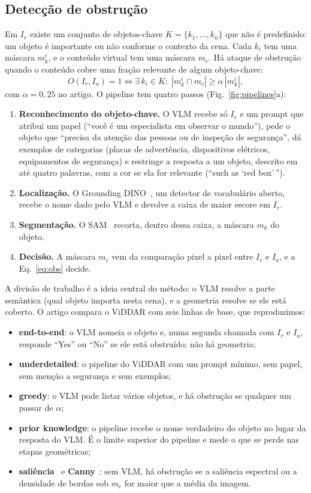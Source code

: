 \documentclass[conference]{IEEEtran}
\newcommand{\Ir}{I_r}
\newcommand{\Ia}{I_a}
\begin{document}
\subsection{Detecção de obstrução}
\label{sec:viddar-obs}
Em $\Ir$ existe um conjunto de objetos-chave $K=\{k_1,\dots,k_n\}$ que não é predefinido: um objeto é
importante ou não conforme o contexto da cena. Cada $k_i$ tem uma máscara $m_k^i$, e o conteúdo virtual
tem uma máscara $m_c$. Há ataque de obstrução quando o conteúdo cobre uma fração relevante de algum
objeto-chave:
\begin{equation}
O(\Ir,\Ia)=1 \iff \exists\, k_i \in K:\; |m_k^i \cap m_c| \geq \alpha\,|m_k^i|,
\label{eq:obs}
\end{equation}
com $\alpha=0{,}25$ no artigo. O pipeline tem quatro passos (Fig.~\ref{fig:pipelines}a):
\begin{enumerate}
\item \textbf{Reconhecimento do objeto-chave.} O VLM recebe só $\Ir$ e um prompt que atribui um papel
  (``você é um especialista em observar o mundo''), pede o objeto que ``precisa da atenção das pessoas ou
  de inspeção de segurança'', dá exemplos de categorias (placas de advertência, dispositivos elétricos,
  equipamentos de segurança) e restringe a resposta a um objeto, descrito em até quatro palavras, com a
  cor se ela for relevante (``such as `red box'\,'').
\item \textbf{Localização.} O Grounding DINO~\cite{groundingdino}, um detector de vocabulário aberto,
  recebe o nome dado pelo VLM e devolve a caixa de maior escore em $\Ir$.
\item \textbf{Segmentação.} O SAM~\cite{sam} recorta, dentro dessa caixa, a máscara $m_k$ do objeto.
\item \textbf{Decisão.} A máscara $m_c$ vem da comparação pixel a pixel entre $\Ir$ e $\Ia$, e a
  Eq.~\eqref{eq:obs} decide.
\end{enumerate}
A divisão de trabalho é a ideia central do método: o VLM resolve a parte semântica (qual objeto importa
nesta cena), e a geometria resolve se ele está coberto. O artigo compara o ViDDAR com seis linhas de
base, que reproduzimos:
\begin{itemize}
\item \textbf{end-to-end}: o VLM nomeia o objeto e, numa segunda chamada com $\Ir$ e $\Ia$, responde
  ``Yes'' ou ``No'' se ele está obstruído; não há geometria;
\item \textbf{underdetailed}: o pipeline do ViDDAR com um prompt mínimo, sem papel, sem menção a
  segurança e sem exemplos;
\item \textbf{greedy}: o VLM pode listar vários objetos, e há obstrução se qualquer um passar de $\alpha$;
\item \textbf{prior knowledge}: o pipeline recebe o nome verdadeiro do objeto no lugar da resposta do
  VLM. É o limite superior do pipeline e mede o que se perde nas etapas geométricas;
\item \textbf{saliência}~\cite{hou2007} e \textbf{Canny}~\cite{canny}: sem VLM, há obstrução se a
  saliência espectral ou a densidade de bordas sob $m_c$ for maior que a média da imagem.
\end{itemize}
\end{document}
